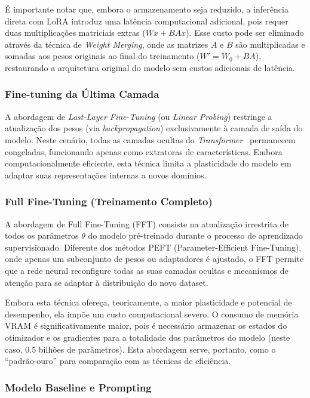 É importante notar que, embora o armazenamento seja reduzido, a inferência direta com LoRA introduz uma latência computacional adicional, pois requer duas multiplicações matriciais extras ($Wx + BAx$). Esse custo pode ser eliminado através da técnica de \textit{Weight Merging}, onde as matrizes $A$ e $B$ são multiplicadas e somadas aos pesos originais ao final do treinamento ($W' = W_0 + BA$), restaurando a arquitetura original do modelo sem custos adicionais de latência.

\subsubsection{Fine-tuning da Última Camada}

A abordagem de \textit{Last-Layer Fine-Tuning} (ou \textit{Linear Probing}) restringe a atualização dos pesos (via \textit{backpropagation}) exclusivamente à camada de saída do modelo. Neste cenário, todas as camadas ocultas do \textit{Transformer}~\cite{vaswani_attention_2017} permanecem congeladas, funcionando apenas como extratoras de características. Embora computacionalmente eficiente, esta técnica limita a plasticidade do modelo em adaptar suas representações internas a novos domínios.

\subsubsection{Full Fine-Tuning (Treinamento Completo)}

A abordagem de Full Fine-Tuning (FFT) consiste na atualização irrestrita de todos os parâmetros $\theta$ do modelo pré-treinado durante o processo de aprendizado supervisionado. Diferente dos métodos PEFT (Parameter-Efficient Fine-Tuning), onde apenas um subconjunto de pesos ou adaptadores é ajustado, o FFT permite que a rede neural reconfigure todas as suas camadas ocultas e mecanismos de atenção para se adaptar à distribuição do novo dataset.

Embora esta técnica ofereça, teoricamente, a maior plasticidade e potencial de desempenho, ela impõe um custo computacional severo. O consumo de memória VRAM é significativamente maior, pois é necessário armazenar os estados do otimizador e os gradientes para a totalidade dos parâmetros do modelo (neste caso, 0.5 bilhões de parâmetros). Esta abordagem serve, portanto, como o ``padrão-ouro'' para comparação com as técnicas de eficiência.

\subsubsection{Modelo Baseline e Prompting}

